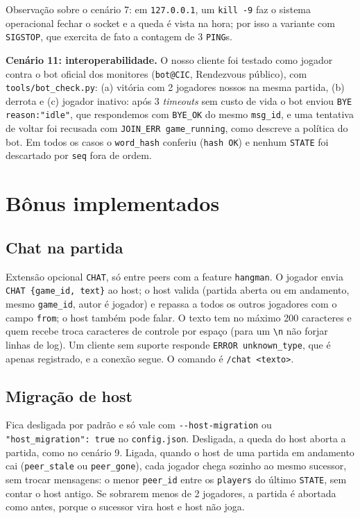 \documentclass[11pt,a4paper]{article}
\begin{document}
Observação sobre o cenário 7: em \texttt{127.0.0.1}, um \texttt{kill -9} faz o sistema operacional fechar o socket e a queda é vista na hora; por isso a variante com \texttt{SIGSTOP}, que exercita de fato a contagem de 3 \texttt{PING}s.

\textbf{Cenário 11: interoperabilidade.} O nosso cliente foi testado como jogador contra o bot oficial dos monitores (\texttt{bot@CIC}, Rendezvous público), com \texttt{tools/bot\_check.py}: (a) vitória com 2 jogadores nossos na mesma partida, (b) derrota e (c) jogador inativo: após 3 \emph{timeouts} sem custo de vida o bot enviou \texttt{BYE reason:"idle"}, que respondemos com \texttt{BYE\_OK} do mesmo \texttt{msg\_id}, e uma tentativa de voltar foi recusada com \texttt{JOIN\_ERR game\_running}, como descreve a política do bot. Em todos os casos o \texttt{word\_hash} conferiu (\texttt{hash OK}) e nenhum \texttt{STATE} foi descartado por \texttt{seq} fora de ordem.

\section{Bônus implementados}\label{sec:bonus}

\subsection{Chat na partida}\label{sec:chat}
Extensão opcional \texttt{CHAT}, só entre peers com a feature \texttt{hangman}. O jogador envia \texttt{CHAT \{game\_id, text\}} ao host; o host valida (partida aberta ou em andamento, mesmo \texttt{game\_id}, autor é jogador) e repassa a todos os outros jogadores com o campo \texttt{from}; o host também pode falar. O texto tem no máximo 200 caracteres e quem recebe troca caracteres de controle por espaço (para um \texttt{\textbackslash n} não forjar linhas de log). Um cliente sem suporte responde \texttt{ERROR unknown\_type}, que é apenas registrado, e a conexão segue. O comando é \texttt{/chat <texto>}.

\subsection{Migração de host}\label{sec:migracao}
Fica desligada por padrão e só vale com \texttt{-{}-host-migration} ou \texttt{"host\_migration": true} no \texttt{config.json}. Desligada, a queda do host aborta a partida, como no cenário 9. Ligada, quando o host de uma partida em andamento cai (\texttt{peer\_stale} ou \texttt{peer\_gone}), cada jogador chega sozinho ao mesmo sucessor, sem trocar mensagens: o menor \texttt{peer\_id} entre os \texttt{players} do último \texttt{STATE}, sem contar o host antigo. Se sobrarem menos de 2 jogadores, a partida é abortada como antes, porque o sucessor vira host e host não joga.
\end{document}
